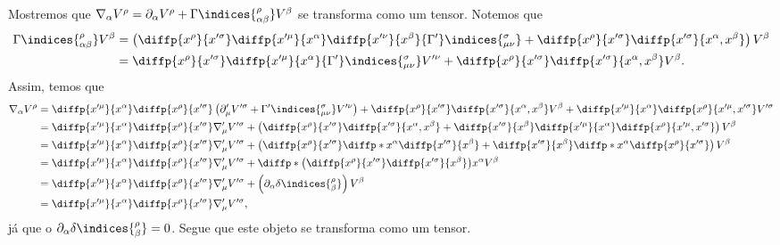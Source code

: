 {Mostremos que \(\nabla_{\alpha} V^\rho = \partial_\alpha V^\rho + \Gamma\indices{^\rho_{\alpha \beta}}V^\beta\) se transforma como um tensor. Notemos que
\begin{align*}
    \Gamma\indices{^\rho_{\alpha \beta}}V^\beta &= \left(\diffp{x^\rho}{x'^\sigma}\diffp{x'^\mu}{x^\alpha} \diffp{x'^\nu}{x^\beta}{\Gamma'}\indices{^\sigma_{\mu\nu}} + \diffp{x^\rho}{x'^\sigma}\diffp{x'^\sigma}{x^\alpha,x^\beta}\right)V^\beta\\
                                                &= \diffp{x^\rho}{x'^\sigma}\diffp{x'^\mu}{x^\alpha} {\Gamma'}\indices{^\sigma_{\mu\nu}}V'^\nu + \diffp{x^\rho}{x'^\sigma}\diffp{x'^\sigma}{x^\alpha,x^\beta}V^\beta.
\end{align*}
Assim, temos que
\begin{align*}
    \nabla_\alpha V^\rho &= \diffp{x'^\mu}{x^\alpha}\diffp{x^\rho}{x'^\sigma}\left(\partial'_\mu V'^\sigma + {\Gamma'}\indices{^\sigma_{\mu\nu}}V'^\nu\right)+ \diffp{x^\rho}{x'^\sigma}\diffp{x'^\sigma}{x^\alpha,x^\beta}V^\beta + \diffp{x'^\mu}{x^\alpha} \diffp{x^\rho}{x'^\mu,x'^\sigma} V'^\sigma\\
                         &=\diffp{x'^\mu}{x^\alpha}\diffp{x^\rho}{x'^\sigma}\nabla'_\mu V'^\sigma + \left(\diffp{x^\rho}{x'^\sigma}\diffp{x'^\sigma}{x^\alpha,x^\beta} + \diffp{x'^\sigma}{x^\beta}\diffp{x'^\mu}{x^\alpha} \diffp{x^\rho}{x'^\mu,x'^\sigma}\right) V^\beta\\
                         &=\diffp{x'^\mu}{x^\alpha}\diffp{x^\rho}{x'^\sigma}\nabla'_\mu V'^\sigma + \left(\diffp{x^\rho}{x'^\sigma}\diffp*{}{x^\alpha}\diffp{x'^\sigma}{x^\beta} + \diffp{x'^\sigma}{x^\beta}\diffp*{}{x^\alpha} \diffp{x^\rho}{x'^\sigma}\right) V^\beta\\
                         &=\diffp{x'^\mu}{x^\alpha}\diffp{x^\rho}{x'^\sigma}\nabla'_\mu V'^\sigma + \diffp*{\left(\diffp{x^\rho}{x'^\sigma} \diffp{x'^\sigma}{x^\beta}\right)}{x^\alpha} V^\beta\\
                         &=\diffp{x'^\mu}{x^\alpha}\diffp{x^\rho}{x'^\sigma}\nabla'_\mu V'^\sigma + \left(\partial_\alpha \delta\indices{^{\rho}_{\beta}}\right)V^\beta\\
                         &=\diffp{x'^\mu}{x^\alpha}\diffp{x^\rho}{x'^\sigma}\nabla'_\mu V'^\sigma,
\end{align*}
já que o \(\partial_\alpha \delta\indices{^\rho_\beta} = 0\). Segue que este objeto se transforma como um tensor.

}
